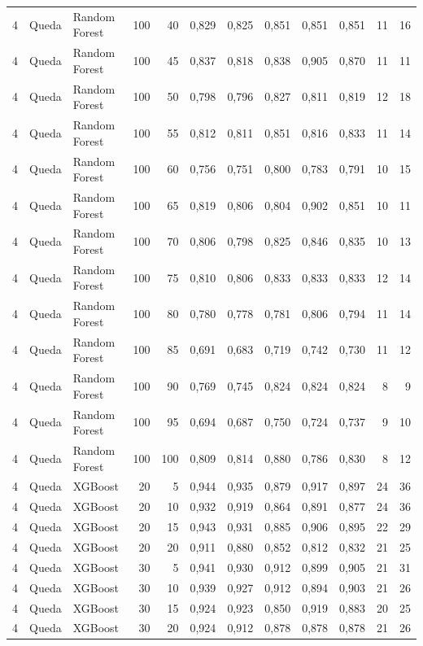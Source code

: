 \begin{longtable}{@{}rllrrrrrrrrr@{}}
4 & Queda & Random Forest & 100 & 40 & 0,829 & 0,825 & 0,851 & 0,851 & 0,851 & 11 & 16 \\
4 & Queda & Random Forest & 100 & 45 & 0,837 & 0,818 & 0,838 & 0,905 & 0,870 & 11 & 11 \\
4 & Queda & Random Forest & 100 & 50 & 0,798 & 0,796 & 0,827 & 0,811 & 0,819 & 12 & 18 \\
4 & Queda & Random Forest & 100 & 55 & 0,812 & 0,811 & 0,851 & 0,816 & 0,833 & 11 & 14 \\
4 & Queda & Random Forest & 100 & 60 & 0,756 & 0,751 & 0,800 & 0,783 & 0,791 & 10 & 15 \\
4 & Queda & Random Forest & 100 & 65 & 0,819 & 0,806 & 0,804 & 0,902 & 0,851 & 10 & 11 \\
4 & Queda & Random Forest & 100 & 70 & 0,806 & 0,798 & 0,825 & 0,846 & 0,835 & 10 & 13 \\
4 & Queda & Random Forest & 100 & 75 & 0,810 & 0,806 & 0,833 & 0,833 & 0,833 & 12 & 14 \\
4 & Queda & Random Forest & 100 & 80 & 0,780 & 0,778 & 0,781 & 0,806 & 0,794 & 11 & 14 \\
4 & Queda & Random Forest & 100 & 85 & 0,691 & 0,683 & 0,719 & 0,742 & 0,730 & 11 & 12 \\
4 & Queda & Random Forest & 100 & 90 & 0,769 & 0,745 & 0,824 & 0,824 & 0,824 & 8 & 9 \\
4 & Queda & Random Forest & 100 & 95 & 0,694 & 0,687 & 0,750 & 0,724 & 0,737 & 9 & 10 \\
4 & Queda & Random Forest & 100 & 100 & 0,809 & 0,814 & 0,880 & 0,786 & 0,830 & 8 & 12 \\
4 & Queda & XGBoost & 20 & 5 & 0,944 & 0,935 & 0,879 & 0,917 & 0,897 & 24 & 36 \\
4 & Queda & XGBoost & 20 & 10 & 0,932 & 0,919 & 0,864 & 0,891 & 0,877 & 24 & 36 \\
4 & Queda & XGBoost & 20 & 15 & 0,943 & 0,931 & 0,885 & 0,906 & 0,895 & 22 & 29 \\
4 & Queda & XGBoost & 20 & 20 & 0,911 & 0,880 & 0,852 & 0,812 & 0,832 & 21 & 25 \\
4 & Queda & XGBoost & 30 & 5 & 0,941 & 0,930 & 0,912 & 0,899 & 0,905 & 21 & 31 \\
4 & Queda & XGBoost & 30 & 10 & 0,939 & 0,927 & 0,912 & 0,894 & 0,903 & 21 & 26 \\
4 & Queda & XGBoost & 30 & 15 & 0,924 & 0,923 & 0,850 & 0,919 & 0,883 & 20 & 25 \\
4 & Queda & XGBoost & 30 & 20 & 0,924 & 0,912 & 0,878 & 0,878 & 0,878 & 21 & 26 \\

\end{longtable}
